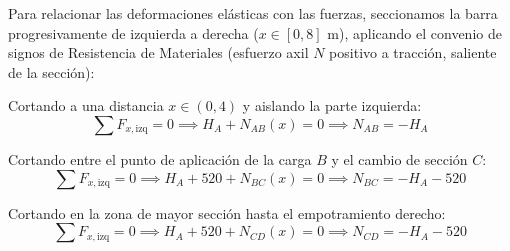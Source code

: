 Para relacionar las deformaciones elásticas con las fuerzas, seccionamos la barra progresivamente de izquierda a derecha ($x \in [0, 8]\text{ m}$), aplicando el convenio de signos de Resistencia de Materiales (esfuerzo axil $N$ positivo a tracción, saliente de la sección):

Cortando a una distancia $x \in (0, 4)$ y aislando la parte izquierda:
\begin{equation}
    \sum F_{x,\text{izq}} = 0 \implies H_A + N_{AB}(x) = 0 \implies \boxed{N_{AB} = -H_A}
    \label{eq:axil_AB}
\end{equation}

Cortando entre el punto de aplicación de la carga $B$ y el cambio de sección $C$:
\begin{equation}
    \sum F_{x,\text{izq}} = 0 \implies H_A + 520 + N_{BC}(x) = 0 \implies \boxed{N_{BC} = -H_A - 520}
    \label{eq:axil_BC}
\end{equation}

Cortando en la zona de mayor sección hasta el empotramiento derecho:
\begin{equation}
    \sum F_{x,\text{izq}} = 0 \implies H_A + 520 + N_{CD}(x) = 0 \implies \boxed{N_{CD} = -H_A - 520}
    \label{eq:axil_CD}
\end{equation}



